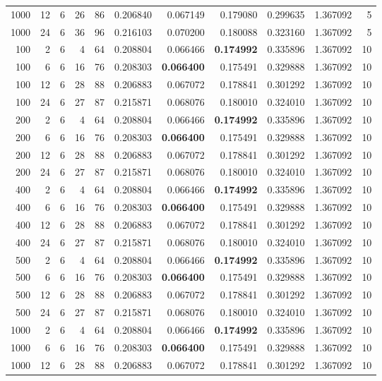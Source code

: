 \begin{table}
\begin{tabular}{rrrrrrrrrrr}
1000 & 12 & 6 & 26 & 86 & 0.206840 & 0.067149 & 0.179080 & 0.299635 & 1.367092 & 5 \\
1000 & 24 & 6 & 36 & 96 & 0.216103 & 0.070200 & 0.180088 & 0.323160 & 1.367092 & 5 \\
100 & 2 & 6 & 4 & 64 & 0.208804 & 0.066466 & \textbf{0.174992} & 0.335896 & 1.367092 & 10 \\
100 & 6 & 6 & 16 & 76 & 0.208303 & \textbf{0.066400} & 0.175491 & 0.329888 & 1.367092 & 10 \\
100 & 12 & 6 & 28 & 88 & 0.206883 & 0.067072 & 0.178841 & 0.301292 & 1.367092 & 10 \\
100 & 24 & 6 & 27 & 87 & 0.215871 & 0.068076 & 0.180010 & 0.324010 & 1.367092 & 10 \\
200 & 2 & 6 & 4 & 64 & 0.208804 & 0.066466 & \textbf{0.174992} & 0.335896 & 1.367092 & 10 \\
200 & 6 & 6 & 16 & 76 & 0.208303 & \textbf{0.066400} & 0.175491 & 0.329888 & 1.367092 & 10 \\
200 & 12 & 6 & 28 & 88 & 0.206883 & 0.067072 & 0.178841 & 0.301292 & 1.367092 & 10 \\
200 & 24 & 6 & 27 & 87 & 0.215871 & 0.068076 & 0.180010 & 0.324010 & 1.367092 & 10 \\
400 & 2 & 6 & 4 & 64 & 0.208804 & 0.066466 & \textbf{0.174992} & 0.335896 & 1.367092 & 10 \\
400 & 6 & 6 & 16 & 76 & 0.208303 & \textbf{0.066400} & 0.175491 & 0.329888 & 1.367092 & 10 \\
400 & 12 & 6 & 28 & 88 & 0.206883 & 0.067072 & 0.178841 & 0.301292 & 1.367092 & 10 \\
400 & 24 & 6 & 27 & 87 & 0.215871 & 0.068076 & 0.180010 & 0.324010 & 1.367092 & 10 \\
500 & 2 & 6 & 4 & 64 & 0.208804 & 0.066466 & \textbf{0.174992} & 0.335896 & 1.367092 & 10 \\
500 & 6 & 6 & 16 & 76 & 0.208303 & \textbf{0.066400} & 0.175491 & 0.329888 & 1.367092 & 10 \\
500 & 12 & 6 & 28 & 88 & 0.206883 & 0.067072 & 0.178841 & 0.301292 & 1.367092 & 10 \\
500 & 24 & 6 & 27 & 87 & 0.215871 & 0.068076 & 0.180010 & 0.324010 & 1.367092 & 10 \\
1000 & 2 & 6 & 4 & 64 & 0.208804 & 0.066466 & \textbf{0.174992} & 0.335896 & 1.367092 & 10 \\
1000 & 6 & 6 & 16 & 76 & 0.208303 & \textbf{0.066400} & 0.175491 & 0.329888 & 1.367092 & 10 \\
1000 & 12 & 6 & 28 & 88 & 0.206883 & 0.067072 & 0.178841 & 0.301292 & 1.367092 & 10 \\

\end{tabular}
\end{table}
